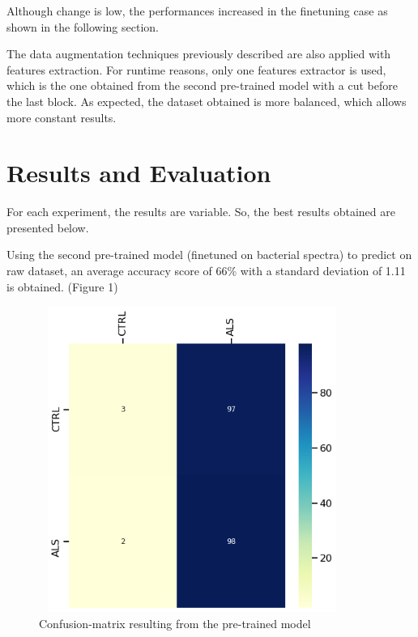 Although change is low, the performances increased in the finetuning case as shown in the following section.

The data augmentation techniques previously described are also applied with features extraction. For runtime reasons, only one features extractor is used, which is the one obtained from the second pre-trained model with a cut before the last block.
As expected, the dataset obtained is more balanced, which allows more constant results.

\section{Results and Evaluation}
For each experiment, the results are variable. So, the best results obtained are presented below.

Using the second pre-trained model (finetuned on bacterial spectra) to predict on raw dataset, an average accuracy score of 66\% with a standard deviation of 1.11 is obtained. (Figure 1)
\begin{figure}[H]
\centering
\caption{Confusion-matrix resulting from the pre-trained model}
\includegraphics[width=10cm, height=10cm]{raw_model_results}
\end{figure}

